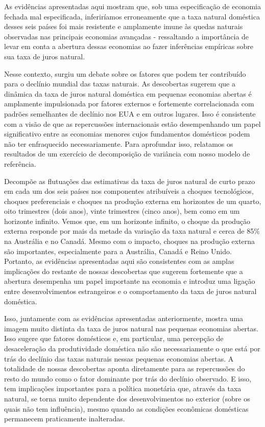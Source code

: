 As evidências apresentadas aqui mostram que, sob uma especificação de economia fechada mal especificada, inferiríamos erroneamente que a taxa natural doméstica desses seis países foi mais resistente e amplamente imune às quedas naturais observadas nas principais economias avançadas - ressaltando a importância de levar em conta a abertura dessas economias ao fazer inferências empíricas sobre sua taxa de juros natural.
   
Nesse contexto, surgiu um debate sobre os fatores que podem ter contribuído para o declínio mundial das taxas naturais. As descobertas sugerem que a dinâmica da taxa de juros natural doméstica em pequenas economias abertas é amplamente impulsionada por fatores externos e fortemente correlacionada com padrões semelhantes de declínio nos EUA e em outros lugares. Isso é consistente com a visão de que as repercussões internacionais estão desempenhando um papel significativo entre as economias menores cujos fundamentos domésticos podem não ter enfraquecido necessariamente. Para aprofundar isso, relatamos os resultados de um exercício de decomposição de variância com nosso modelo de referência.

Decompõe as flutuações das estimativas da taxa de juros natural de curto prazo em cada um dos seis países nos componentes atribuíveis a choques tecnológicos, choques preferenciais e choques na produção externa em horizontes de um quarto, oito trimestres (dois anos), vinte trimestres (cinco anos), bem como em um horizonte infinito. Vemos que, em um horizonte infinito, o choque da produção externa responde por mais da metade da variação da taxa natural e cerca de 85$\%$ na Austrália e no Canadá. Mesmo com o impacto, choques na produção externa são importantes, especialmente para a Austrália, Canadá e Reino Unido. Portanto, as evidências apresentadas aqui são consistentes com as amplas implicações do restante de nossas descobertas que sugerem fortemente que a abertura desempenha um papel importante na economia e introduz uma ligação entre desenvolvimentos estrangeiros e o comportamento da taxa de juros natural doméstica.

Isso, juntamente com as evidências apresentadas anteriormente, mostra uma imagem muito distinta da taxa de juros natural nas pequenas economias abertas. Isso sugere que fatores domésticos e, em particular, uma percepção de desaceleração da produtividade doméstica não são necessariamente o que está por trás do declínio das taxas naturais nessas pequenas economias abertas. A totalidade de nossas descobertas aponta diretamente para as repercussões do resto do mundo como o fator dominante por trás do declínio observado. E isso, tem implicações importantes para a política monetária que, através da taxa natural, se torna muito dependente dos desenvolvimentos no exterior (sobre os quais não tem influência), mesmo quando as condições econômicas domésticas permanecem praticamente inalteradas.

